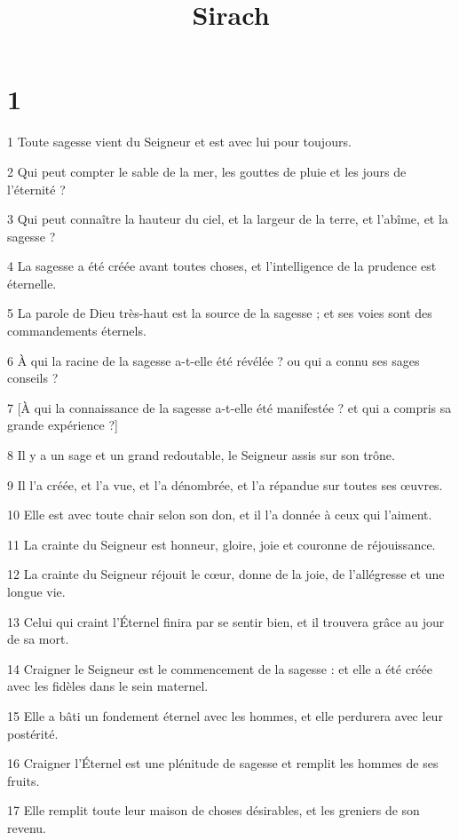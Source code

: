 

\title{Sirach}


\chapter{1}

\par 1 Toute sagesse vient du Seigneur et est avec lui pour toujours.
\par 2 Qui peut compter le sable de la mer, les gouttes de pluie et les jours de l'éternité ?
\par 3 Qui peut connaître la hauteur du ciel, et la largeur de la terre, et l'abîme, et la sagesse ?
\par 4 La sagesse a été créée avant toutes choses, et l'intelligence de la prudence est éternelle.
\par 5 La parole de Dieu très-haut est la source de la sagesse ; et ses voies sont des commandements éternels.
\par 6 À qui la racine de la sagesse a-t-elle été révélée ? ou qui a connu ses sages conseils ?
\par 7 [À qui la connaissance de la sagesse a-t-elle été manifestée ? et qui a compris sa grande expérience ?]
\par 8 Il y a un sage et un grand redoutable, le Seigneur assis sur son trône.
\par 9 Il l'a créée, et l'a vue, et l'a dénombrée, et l'a répandue sur toutes ses œuvres.
\par 10 Elle est avec toute chair selon son don, et il l'a donnée à ceux qui l'aiment.
\par 11 La crainte du Seigneur est honneur, gloire, joie et couronne de réjouissance.
\par 12 La crainte du Seigneur réjouit le cœur, donne de la joie, de l'allégresse et une longue vie.
\par 13 Celui qui craint l'Éternel finira par se sentir bien, et il trouvera grâce au jour de sa mort.
\par 14 Craigner le Seigneur est le commencement de la sagesse : et elle a été créée avec les fidèles dans le sein maternel.
\par 15 Elle a bâti un fondement éternel avec les hommes, et elle perdurera avec leur postérité.
\par 16 Craigner l'Éternel est une plénitude de sagesse et remplit les hommes de ses fruits.
\par 17 Elle remplit toute leur maison de choses désirables, et les greniers de son revenu.

